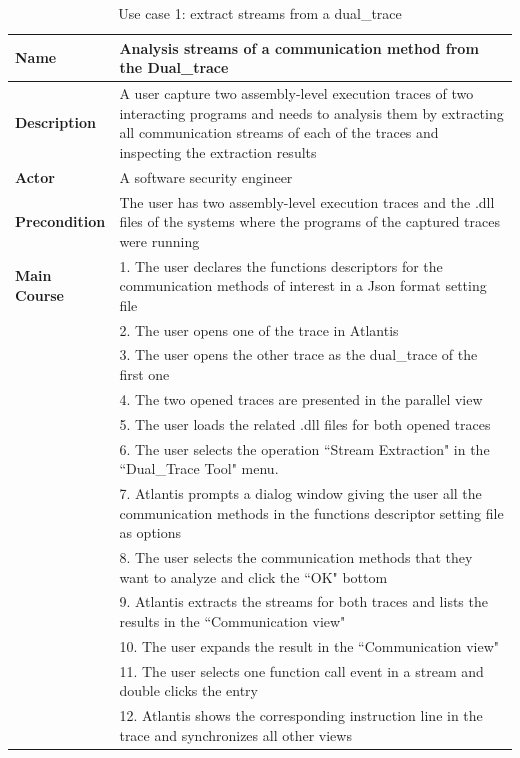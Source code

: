 \documentclass[12pt,oneside]{book}
\begin{document}
\begin{table}[H]
  \centering
  \caption{Use case 1: extract streams from a dual\_trace}
  \label{usecase1}
  \begin{tabular}{|l|p{13cm}|}
      \hline
       \textbf{Name} & Analysis streams of a communication method from the Dual\_trace\\
       \hline
       \textbf{Description} & A user capture two assembly-level execution traces of two interacting programs and needs to analysis them by extracting all communication streams of each of the traces and inspecting the extraction results \\
       \hline
              \textbf{Actor} & A software security engineer \\
       \hline
       \textbf{Precondition} & The user has two assembly-level execution traces and the .dll files of the systems where the programs of the captured traces were running\\
       \hline
       \textbf{Main Course}& 1. The user declares the functions descriptors for the communication methods of interest in a Json format setting file\\
        & 2. The user opens one of the trace in Atlantis\\
       &  3. The user opens the other trace as the dual\_trace of the first one\\
       & 4. The two opened traces are presented in the parallel view\\
       & 5. The user loads the related .dll files for both opened traces\\
       & 6. The user selects the operation ``Stream Extraction" in the ``Dual\_Trace Tool" menu.\\
       & 7. Atlantis prompts a dialog window giving the user all the communication methods in the functions descriptor setting file as options\\
       & 8. The user selects the communication methods that they want to analyze and click the ``OK" bottom\\
       & 9. Atlantis extracts the streams for both traces and lists the results in the ``Communication view"\\
       & 10. The user expands the result in the ``Communication view"\\
       & 11. The user selects one function call event in a stream and double clicks the entry\\
       & 12. Atlantis shows the corresponding instruction line in the trace and synchronizes all other views\\
      \hline               
  \end{tabular}
\end{table}
\end{document}
